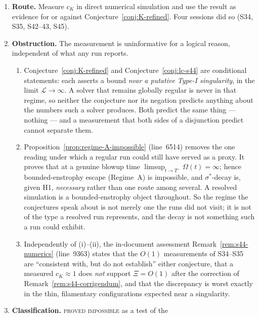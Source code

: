 \documentclass[11pt]{article}
\theoremstyle{definition}
\theoremstyle{remark}
\begin{document}
\begin{enumerate}[label=(\alph*),leftmargin=2.2em]
  \item \textbf{Route.} Measure $c_K$ in direct numerical simulation and use
    the result as evidence for or against Conjecture~\ref{conj:K-refined}.
    Four sessions did so (S34, S35, S42--43, S45).
  \item \textbf{Obstruction.} The measurement is uninformative for a logical
    reason, independent of what any run reports.
    \begin{enumerate}[label=\textup{(\roman*)},leftmargin=2.6em]
      \item Conjecture~\ref{conj:K-refined} and
        Conjecture~\ref{conj:lc-s44} are conditional statements: each asserts
        a bound \emph{near a putative Type-I singularity}, in the limit
        $\mathcal{L}\to\infty$. A solver that remains globally regular is
        never in that regime, so neither the conjecture nor its negation
        predicts anything about the numbers such a solver produces. Both
        predict the same thing --- nothing --- and a measurement that both
        sides of a disjunction predict cannot separate them.
      \item Proposition~\ref{prop:regime-A-impossible} (line~6514) removes
        the one reading under which a regular run could still have served as
        a proxy. It proves that at a genuine blowup time
        $\limsup_{t\to T^-}\Omega(t)=\infty$; hence bounded-enstrophy escape
        (Regime~A) is impossible, and $\sigma^*$-decay is, given H1,
        \emph{necessary} rather than one route among several. A resolved
        simulation is a bounded-enstrophy object throughout. So the regime
        the conjectures speak about is not merely one the runs did not visit;
        it is not of the type a resolved run represents, and the decay is
        not something such a run could exhibit.
      \item Independently of (i)--(ii), the in-document assessment
        Remark~\ref{rem:s44-numerics} (line~9363) states that the $O(1)$
        measurements of S34--S35 are ``consistent with, but do not
        establish'' either conjecture, that a measured $c_K\approx1$ does
        \emph{not} support $\Xi=O(1)$ after the correction of
        Remark~\ref{rem:s44-corrigendum}, and that the discrepancy is worst
        exactly in the thin, filamentary configurations expected near a
        singularity.
    \end{enumerate}
  \item \textbf{Classification.} \textsc{proved impossible} as a test of the

\end{enumerate}
\end{document}
